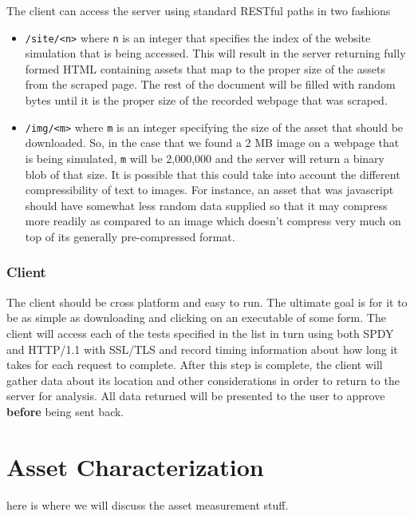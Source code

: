 \documentclass[11pt,letterpaper,notitlepage]{article}
\begin{document}
The client can access the server using standard RESTful paths in two fashions
\begin{itemize}
\item \texttt{/site/<n>} where \texttt{n} is an integer that specifies the index
of the website simulation that is being accessed.  This will result in the
server returning fully formed HTML containing assets that map to the proper size
of the assets from the scraped page.  The rest of the document will be filled
with random bytes until it is the proper size of the recorded webpage that was
scraped.
\item \texttt{/img/<m>} where \texttt{m} is an integer specifying the size of the
asset that should be downloaded. So, in the case that we found a 2 MB image on a
webpage that is being simulated, \texttt{m} will be 2,000,000 and the server
will return a binary blob of that size. It is possible that this could take into
account the different compressibility of text to images.  For instance, an asset
that was javascript should have somewhat less random data supplied so that it
may compress more readily as compared to an image which doesn't compress very
much on top of its generally pre-compressed format.
\end{itemize}

\subsubsection{Client}
\label{sec:research/client}
The client should be cross platform and easy to run.  The ultimate goal is for
it to be as simple as downloading and clicking on an executable of some form.
The client will access each of the tests specified in the list in turn using
both SPDY and HTTP/1.1 with SSL/TLS and
record timing information about how long it takes for each request to complete.
After this step is complete, the client will gather data about its location and
other considerations in order to return to the server for analysis.  All data
returned will be presented to the user to approve \textbf{before} being sent
back.

\section{Asset Characterization}
\label{sec:assets}
here is where we will discuss the asset measurement stuff.
\end{document}
